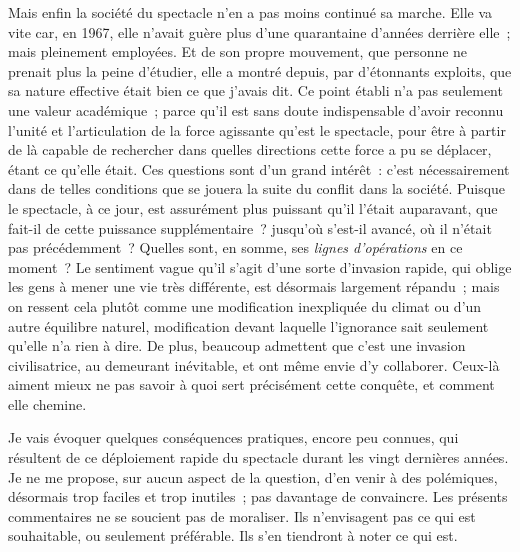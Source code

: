 \documentclass[french,twoside]{book} %
\def\mednobreak{\ifdim\lastskip<\medskipamount
  \removelastskip\nopagebreak\medskip\fi}
\newcommand{\labelblock}[1]{\medbreak{\noindent\color{rubric}\bfseries #1}\par\mednobreak}
\begin{document}
Mais enfin la société du spectacle n’en a pas moins continué sa marche. Elle va vite car, en 1967, elle n’avait guère plus d’une quarantaine d’années derrière elle ; mais pleinement employées. Et de son propre mouvement, que personne ne prenait plus la peine d’étudier, elle a montré depuis, par d’étonnants exploits, que sa nature effective était bien ce que j’avais dit. Ce point établi n’a pas seulement une valeur académique ; parce qu’il est sans doute indispensable d’avoir reconnu l’unité et l’articulation de la force agissante qu’est le spectacle, pour être à partir de là capable de rechercher dans quelles directions cette force a pu se déplacer, étant ce qu’elle était. Ces questions sont d’un grand intérêt : c’est nécessairement dans de telles conditions que se jouera la suite du conflit dans la société. Puisque le spectacle, à ce jour, est assurément plus puissant qu’il l’était auparavant, que fait-il de cette puissance supplémentaire ? jusqu’où s’est-il avancé, où il n’était pas précédemment ? Quelles sont, en somme, ses \emph{lignes d’opérations} en ce moment ? Le sentiment vague qu’il s’agit d’une sorte d’invasion rapide, qui oblige les gens à mener une vie très différente, est désormais largement répandu ; mais on ressent cela plutôt comme une modification inexpliquée du climat ou d’un autre équilibre naturel, modification devant laquelle l’ignorance sait seulement qu’elle n’a rien à dire. De plus, beaucoup admettent que c’est une invasion civilisatrice, au demeurant inévitable, et ont même envie d’y collaborer. Ceux-là aiment mieux ne pas savoir à quoi sert précisément cette conquête, et comment elle chemine.\par
Je vais évoquer quelques conséquences pratiques, encore peu connues, qui résultent de ce déploiement rapide du spectacle durant les vingt dernières années. Je ne me propose, sur aucun aspect de la question, d’en venir à des polémiques, désormais trop faciles et trop inutiles ; pas davantage de convaincre. Les présents commentaires ne se soucient pas de moraliser. Ils n’envisagent pas ce qui est souhaitable, ou seulement préférable. Ils s’en tiendront à noter ce qui est.\par

\labelblock{III}
\end{document}
